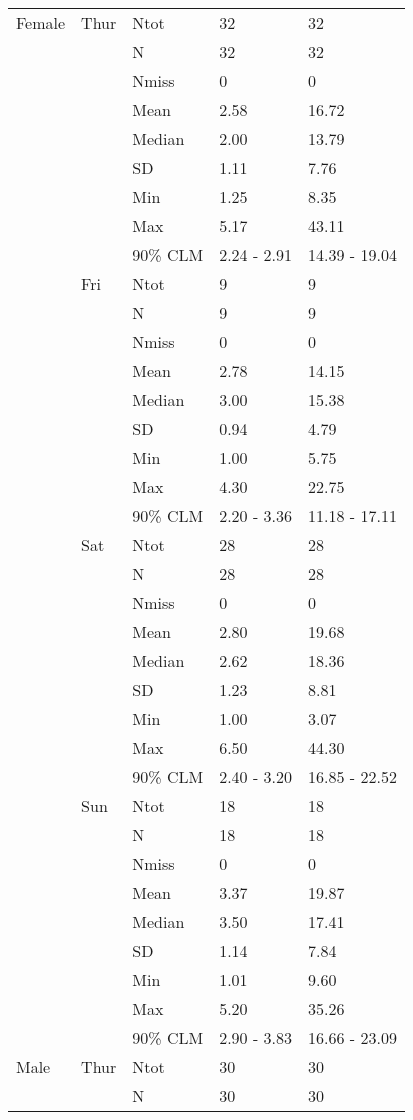 \documentclass[8pt]{beamer}
\begin{document}
\begin{frame}
\begin{longtable}{p{3cm}llll}
\endlastfoot
Female & Thur & Ntot & 32 & 32 \\
 &  & N & 32 & 32 \\
 &  & Nmiss & 0 & 0 \\
 &  & Mean & 2.58 & 16.72 \\
 &  & Median & 2.00 & 13.79 \\
 &  & SD & 1.11 & 7.76 \\
 &  & Min & 1.25 & 8.35 \\
 &  & Max & 5.17 & 43.11 \\
 &  & 90\% CLM & 2.24 - 2.91 & 14.39 - 19.04 \\
[2ex]
 & Fri & Ntot & 9 & 9 \\
 &  & N & 9 & 9 \\
 &  & Nmiss & 0 & 0 \\
 &  & Mean & 2.78 & 14.15 \\
 &  & Median & 3.00 & 15.38 \\
 &  & SD & 0.94 & 4.79 \\
 &  & Min & 1.00 & 5.75 \\
 &  & Max & 4.30 & 22.75 \\
 &  & 90\% CLM & 2.20 - 3.36 & 11.18 - 17.11 \\
[2ex]
 & Sat & Ntot & 28 & 28 \\
 &  & N & 28 & 28 \\
 &  & Nmiss & 0 & 0 \\
 &  & Mean & 2.80 & 19.68 \\
 &  & Median & 2.62 & 18.36 \\
 &  & SD & 1.23 & 8.81 \\
 &  & Min & 1.00 & 3.07 \\
 &  & Max & 6.50 & 44.30 \\
 &  & 90\% CLM & 2.40 - 3.20 & 16.85 - 22.52 \\
[2ex]
 & Sun & Ntot & 18 & 18 \\
 &  & N & 18 & 18 \\
 &  & Nmiss & 0 & 0 \\
 &  & Mean & 3.37 & 19.87 \\
 &  & Median & 3.50 & 17.41 \\
 &  & SD & 1.14 & 7.84 \\
 &  & Min & 1.01 & 9.60 \\
 &  & Max & 5.20 & 35.26 \\
 &  & 90\% CLM & 2.90 - 3.83 & 16.66 - 23.09 \\
[2ex]
Male & Thur & Ntot & 30 & 30 \\
 &  & N & 30 & 30 \\

\end{longtable}
\end{frame}
\end{document}

